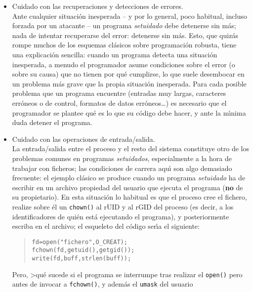 \begin{itemize}
correctas, ya no en su
formato sino m\'as bien en su origen: >de qui\'en proviene un archivo del que
nuestro programa lee sus datos, de una fuente fiable o de un atacante que por
cualquier m\'etodo -- no nos importa cu\'al -- ha conseguido reemplazar ese
archivo por otro que \'el ha creado?
\item Cuidado con las recuperaciones y detecciones de errores.\\
Ante cualquier situaci\'on inesperada -- y por lo general, poco habitual, 
incluso forzada por un atacante -- un programa {\it setuidado} debe detenerse
sin m\'as; nada de intentar recuperarse del error: detenerse sin m\'as. Esto,
que quiz\'as rompe muchos de los esquemas cl\'asicos sobre programaci\'on 
robusta, tiene una explicaci\'on sencilla: cuando un programa detecta una 
situaci\'on inesperada, a menudo el programador asume condiciones sobre el error
(o sobre su causa) que no tienen por qu\'e cumplirse, lo que suele desembocar
en un problema m\'as grave que la propia situaci\'on inesperada. Para cada
posible problema que un programa encuentre (entradas muy largas, caracteres
err\'oneos o de control, formatos de datos err\'oneos\ldots) es necesario que
el programador se plantee qu\'e es lo que su c\'odigo debe hacer, y ante la 
m\'{\i}nima duda detener el programa.
\item Cuidado con las operaciones de entrada/salida.\\
La entrada/salida entre el proceso y el resto del sistema constituye otro de 
los problemas comunes en programas {\it setuidados}, especialmente a la hora
de trabajar con ficheros; las condiciones de carrera aqu\'{\i} son algo 
demasiado frecuente: el ejemplo cl\'asico se produce cuando un programa {\it
setuidado} ha de escribir en un archivo propiedad del usuario que ejecuta el
programa ({\bf no} de su propietario). En esta situaci\'on lo habitual es que
el proceso cree el fichero, realize sobre \'el un {\tt chown()} al rUID y al
rGID del proceso (es decir, a los identificadores de qui\'en est\'a ejecutando
el programa), y posteriormente escriba en el archivo; el esqueleto del c\'odigo
ser\'{\i}a el siguiente:
\begin{quote}
\begin{verbatim}
fd=open("fichero",O_CREAT);
fchown(fd,getuid(),getgid());
write(fd,buff,strlen(buff));
\end{verbatim}
\end{quote}
Pero, >qu\'e sucede si el programa se interrumpe tras realizar el {\tt open()}
pero antes de invocar a {\tt fchown()}, y adem\'as el {\tt umask} del usuario

\end{itemize}
